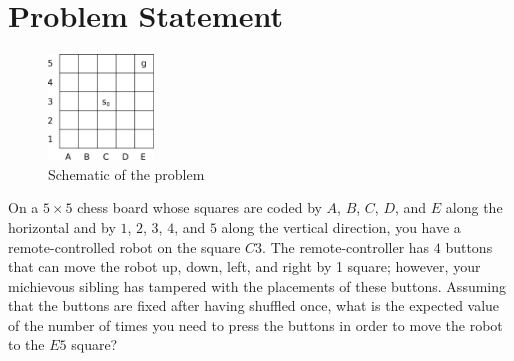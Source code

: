 \vspace{-1mm}
\section{Problem Statement}
%
\begin{figure} %
    \vspace{-5mm}
    \centering
    \includegraphics[width=0.25\textwidth]{./figures/drawing.eps}
    \caption{Schematic of the problem}
    \label{fig:schematic}
    \vspace{-5mm}
\end{figure}
%


On a $5 \times 5$ chess board whose squares are coded by $A$, $B$, $C$, $D$, and
$E$ along the horizontal and by $1$, $2$, $3$, $4$, and $5$ along the vertical
direction, you have a remote-controlled robot on the square $C3$. The
remote-controller has $4$ buttons that can move the robot up, down, left, and
right by 1 square; however, your michievous sibling has tampered with the
placements of these buttons. Assuming that the buttons are fixed after having
shuffled once, what is the expected value of the number of times you need to
press the buttons in order to move the robot to the $E5$ square?